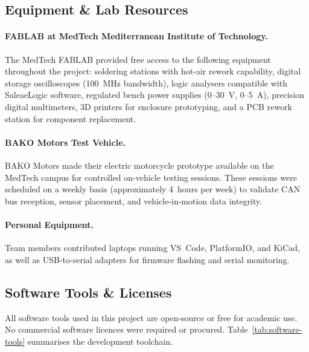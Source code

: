 \subsection{Equipment \& Lab Resources}

\paragraph{FABLAB at MedTech Mediterranean Institute of Technology.}
The MedTech FABLAB provided free access to the following equipment throughout the project: soldering stations with hot-air rework capability, digital storage oscilloscopes (100~MHz bandwidth), logic analysers compatible with SaleaeLogic software, regulated bench power supplies (0--30~V, 0--5~A), precision digital multimeters, 3D printers for enclosure prototyping, and a PCB rework station for component replacement.

\paragraph{BAKO Motors Test Vehicle.}
BAKO Motors made their electric motorcycle prototype available on the MedTech campus for controlled on-vehicle testing sessions. These sessions were scheduled on a weekly basis (approximately 4~hours per week) to validate CAN bus reception, sensor placement, and vehicle-in-motion data integrity.

\paragraph{Personal Equipment.}
Team members contributed laptops running VS~Code, PlatformIO, and KiCad, as well as USB-to-serial adapters for firmware flashing and serial monitoring.

\subsection{Software Tools \& Licenses}

All software tools used in this project are open-source or free for academic use. No commercial software licences were required or procured. Table~\ref{tab:software-tools} summarises the development toolchain.

